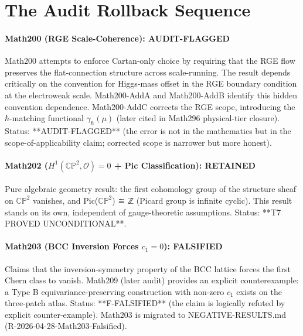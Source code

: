 \section{The Audit Rollback Sequence}

\paragraph{Math200 (RGE Scale-Coherence): AUDIT-FLAGGED}

Math200 attempts to enforce Cartan-only choice by requiring that the RGE flow
preserves the flat-connection structure across scale-running. The result depends
critically on the convention for Higgs-mass offset in the RGE boundary condition
at the electroweak scale. Math200-AddA and Math200-AddB identify this hidden
convention dependence. Math200-AddC corrects the RGE scope, introducing the
$\hbar$-matching functional $\gamma_\hbar(\mu)$ (later cited in Math296 physical-tier closure).
Status: **AUDIT-FLAGGED** (the error is not in the mathematics but in the
scope-of-applicability claim; corrected scope is narrower but more honest).

\paragraph{Math202 ($H^1(\mathbb{CP}^2, \mathcal{O}) = 0$ + Pic Classification): RETAINED}

Pure algebraic geometry result: the first cohomology group of the structure sheaf
on $\mathbb{CP}^2$ vanishes, and Pic($\mathbb{CP}^2$) ≅ ℤ (Picard group is infinite
cyclic). This result stands on its own, independent of gauge-theoretic assumptions.
Status: **T7 PROVED UNCONDITIONAL**.

\paragraph{Math203 (BCC Inversion Forces $c_1 = 0$): FALSIFIED}

Claims that the inversion-symmetry property of the BCC lattice forces the first
Chern class to vanish. Math209 (later audit) provides an explicit counterexample:
a Type B equivariance-preserving construction with non-zero $c_1$ exists on the
three-patch atlas. Status: **F-FALSIFIED** (the claim is logically refuted by
explicit counter-example). Math203 is migrated to NEGATIVE-RESULTS.md (R-2026-04-28-Math203-Falsified).

